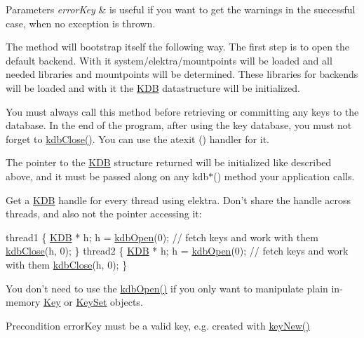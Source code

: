 \begin{DoxyParams}{Parameters}
{\em error\-Key} & is useful if you want to get the warnings in the successful case, when no exception is thrown.\\
\hline
\end{DoxyParams}
The method will bootstrap itself the following way. The first step is to open the default backend. With it system/elektra/mountpoints will be loaded and all needed libraries and mountpoints will be determined. These libraries for backends will be loaded and with it the {\ttfamily \hyperlink{classkdb_1_1KDB}{K\-D\-B}} datastructure will be initialized.

You must always call this method before retrieving or committing any keys to the database. In the end of the program, after using the key database, you must not forget to \hyperlink{group__kdb_gadb54dc9fda17ee07deb9444df745c96f}{kdb\-Close()}. You can use the atexit () handler for it.

The pointer to the {\ttfamily \hyperlink{classkdb_1_1KDB}{K\-D\-B}} structure returned will be initialized like described above, and it must be passed along on any kdb$\ast$() method your application calls.

Get a {\ttfamily \hyperlink{classkdb_1_1KDB}{K\-D\-B}} handle for every thread using elektra. Don't share the handle across threads, and also not the pointer accessing it\-: 
\begin{DoxyCode}
thread1
\{
        \hyperlink{classkdb_1_1KDB_a7e0637995ce9f294cdbc6f167df6db40}{KDB} * h;
        h = \hyperlink{group__kdb_ga6808defe5870f328dd17910aacbdc6ca}{kdbOpen}(0);
        \textcolor{comment}{// fetch keys and work with them}
        \hyperlink{group__kdb_gadb54dc9fda17ee07deb9444df745c96f}{kdbClose}(h, 0);
\}
thread2
\{
        \hyperlink{classkdb_1_1KDB_a7e0637995ce9f294cdbc6f167df6db40}{KDB} * h;
        h = \hyperlink{group__kdb_ga6808defe5870f328dd17910aacbdc6ca}{kdbOpen}(0);
        \textcolor{comment}{// fetch keys and work with them}
        \hyperlink{group__kdb_gadb54dc9fda17ee07deb9444df745c96f}{kdbClose}(h, 0);
\}
\end{DoxyCode}


You don't need to use the \hyperlink{group__kdb_ga6808defe5870f328dd17910aacbdc6ca}{kdb\-Open()} if you only want to manipulate plain in-\/memory \hyperlink{classkdb_1_1Key}{Key} or \hyperlink{classkdb_1_1KeySet}{Key\-Set} objects.

\begin{DoxyPrecond}{Precondition}
error\-Key must be a valid key, e.\-g. created with \hyperlink{group__key_gad23c65b44bf48d773759e1f9a4d43b89}{key\-New()}
\end{DoxyPrecond}

